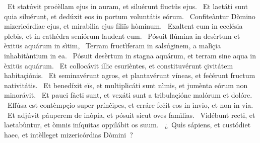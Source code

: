 {~Et statúvit proċèllam ejus in auram, et siluérunt fluctüs ejus. 
~Et laetáti sunt quia siluérunt, et dedúxit eos in portum voluntátis eórum. 
~Confiteàntur Dòmino mizericórdiae ejus, et mirabìlia ejus fíliïs hòminum. 
~Exaltent eum in ecclésia plebis, et in cathédra seniórum laudent eum. 
~Pósuit flúmina in desèrtum et èxitüs aquárum in sìtim, 
~Terram fructìferam in salsúginem, a malìçia inhabitàntium in ea. 
~Pósuit desèrtum in stagna aquárum, et terram sine aqua in èxitüs aquárum. 
~Et collocávit illic esurièntes, et constituvérunt çivitátem habitaçiónis. 
~Et seminavérunt agros, et plantavérunt víneas, et feċérunt fructum nativitátis. 
~Et benedíxit eïs, et multiplicáti sunt nìmis, et jumènta eórum non minorávit. 
~Et pauci fàcti sunt, et vexáti sunt a tribulaçióne malórum et dolóre. 
~Effúsa est contèmpçio super prínċipes, et erráre feċit eos in ìnvio, et non in via. 
~Et adjúvit páuperem de inòpia, et pósuit sicut oves famìlias. 
~Vidébunt recti, et laetabùntur, et òmnis iníquitas oppilábit os suum. 
~¿~Quìs sápiens, et custódiet haec, et intèlleget mizericórdias Dòmini~? 
}
